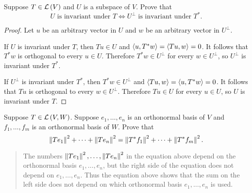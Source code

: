 \begin{exercise}
    Suppose $T\in\mathcal{L}\left({V}\right)$ and $U$ is a subspace of $V$. Prove that
    \[
        \text{$U$ is invariant under $T$}\Longleftrightarrow \text{$U^{\bot}$ is invariant under $T^{*}$}.
    \]
\end{exercise}

\begin{proof}
    Let $u$ be an arbitrary vector in $U$ and $w$ be an arbitrary vector in $U^{\bot}$.

    If $U$ is invariant under $T$, then $Tu\in U$ and $\left\langle{u, T^{*}w}\right\rangle = \left\langle{Tu, w}\right\rangle = 0$. It follows that $T^{*}w$ is orthogonal to every $u\in U$. Therefore $T^{*}w\in U^{\bot}$ for every $w\in U^{\bot}$, so $U^{\bot}$ is invariant under $T^{*}$.

    If $U^{\bot}$ is invariant under $T^{*}$, then $T^{*}w\in U^{\bot}$ and $\left\langle{Tu, w}\right\rangle = \left\langle{u, T^{*}w}\right\rangle = 0$. It follows that $Tu$ is orthogonal to every $w\in U^{\bot}$. Therefore $Tu\in U$ for every $u\in U$, so $U$ is invariant under $T$.
\end{proof}
\newpage

\begin{exercise}\label{chapter7:sectionA:exercise5}
    Suppose $T\in\mathcal{L}\left({V, W}\right)$. Suppose $e_{1}, \ldots, e_{n}$ is an orthonormal basis of $V$ and $f_{1}, \ldots, f_{m}$ is an orthonormal basis of $W$. Prove that
    \[
        \left\Vert{Te_{1}}\right\Vert^{2} + \cdots + \left\Vert{Te_{n}}\right\Vert^{2} = \left\Vert{T^{*}f_{1}}\right\Vert^{2} + \cdots + \left\Vert{T^{*}f_{m}}\right\Vert^{2}.
    \]
\end{exercise}

\begin{quote}
    The numbers $\left\Vert{Te_{1}}\right\Vert^{2}, \ldots, \left\Vert{Te_{n}}\right\Vert^{2}$ in the equation above depend on the orthonormal basis $e_{1}, \ldots, e_{n}$, but the right side of the equation does not depend on $e_{1}, \ldots, e_{n}$. Thus the equation above shows that the sum on the left side does not depend on which orthonormal basis $e_{1}, \ldots, e_{n}$ is used.
\end{quote}

